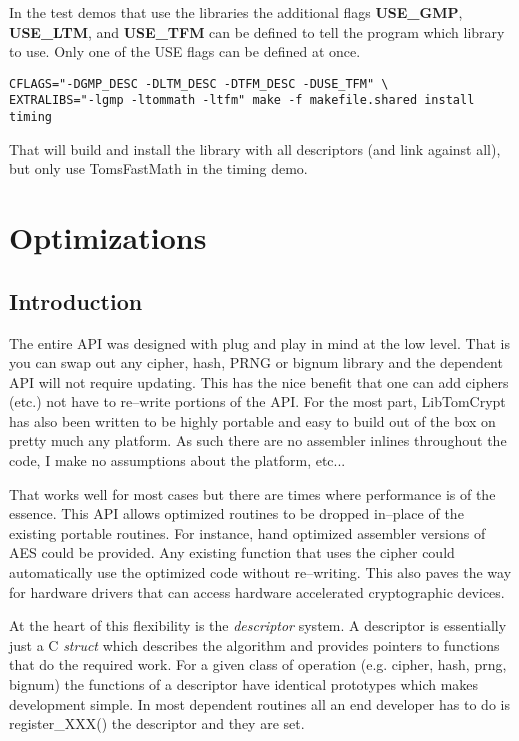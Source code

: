 \documentclass[synpaper]{book}
\newcommand{\mysection}[1]    %
	{                   %
	\section{#1}
   \markboth{\textsf{www.libtom.org}}{\thesection ~ {#1}}
	}
\begin{document}
In the test demos that use the libraries the additional flags \textbf{USE\_GMP}, \textbf{USE\_LTM}, and \textbf{USE\_TFM} can be defined
to tell the program which library to use.  Only one of the USE flags can be defined at once.

     
\begin{small}
\begin{verbatim}
CFLAGS="-DGMP_DESC -DLTM_DESC -DTFM_DESC -DUSE_TFM" \
EXTRALIBS="-lgmp -ltommath -ltfm" make -f makefile.shared install timing
\end{verbatim}
\end{small}

That will build and install the library with all descriptors (and link against all), but only use TomsFastMath in the timing demo.

\chapter{Optimizations}
\mysection{Introduction}
The entire API was designed with plug and play in mind at the low level.  That is you can swap out any cipher, hash, PRNG or bignum library and the dependent API will not
require updating.  This has the nice benefit that one can add ciphers (etc.) not have to re--write portions of the API.  For the most part, LibTomCrypt has also been written
to be highly portable and easy to build out of the box on pretty much any platform.  As such there are no assembler inlines throughout the code, I make no assumptions
about the platform, etc...

That works well for most cases but there are times where performance is of the essence.  This API allows optimized routines to be dropped in--place of the existing
portable routines.  For instance, hand optimized assembler versions of AES could be provided.  Any existing function that uses the cipher could automatically use
the optimized code without re--writing.  This also paves the way for hardware drivers that can access hardware accelerated cryptographic devices.

At the heart of this flexibility is the \textit{descriptor} system.  A descriptor is essentially just a C \textit{struct} which describes the algorithm and provides pointers
to functions that do the required work.  For a given class of operation (e.g. cipher, hash, prng, bignum) the functions of a descriptor have identical prototypes which makes
development simple.  In most dependent routines all an end developer has to do is register\_XXX() the descriptor and they are set.
\end{document}
